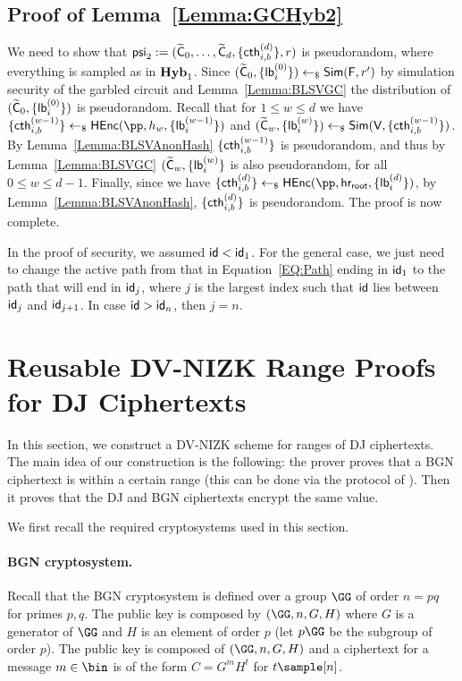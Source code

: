 \subsection{Proof of Lemma~\ref{Lemma:GCHyb2}}\label{SubSec:Lemma1proof2}
We need to show that $\mathsf{psi}_2 := (\widetilde{\mathsf{C}}_0, \dots , \widetilde{\mathsf{C}}_{d} , \{\mathsf{cth}^{(d)}_{i,b} \} , r)$ is pseudorandom, where everything is sampled as in $\mathsf{\mathbf{Hyb}}_1$.   Since $(\widetilde{\mathsf{C}}_0 , \{\mathsf{lb}_i^{(0)} \}) \leftarrow_\$ \mathsf{Sim}(\mathsf{F} , r')$ by simulation security of the garbled circuit and Lemma~\ref{Lemma:BLSVGC} the distribution of $(\widetilde{\mathsf{C}}_0 , \{\mathsf{lb}_i^{(0)} \})$ is pseudorandom. Recall that  for $1 \leq w \leq d$ we have $\{\cth^{(w-1)}_{i,b}\} \pick \HEnc(\pp , h_w , \{\lb_i^{(w-1)} \}  )$ and $(\widetilde{\mathsf{C}}_w , \{\mathsf{lb}_{i}^{(w)} \}) \leftarrow_\$ \mathsf{Sim}(\mathsf{V} , \{\mathsf{cth}_{i,b}^{(w-1)}\})$. By Lemma~\ref{Lemma:BLSVAnonHash} $\{\mathsf{cth}^{(w-1)}_{i,b}\}$ is pseudorandom, and thus by Lemma~\ref{Lemma:BLSVGC} $(\widetilde{\mathsf{C}}_w , \{\mathsf{lb}_{i}^{(w)} \}$ is also pseudorandom, for all $0 \leq w \leq d-1$. Finally, since we have  $\{\cth^{(d)}_{i,b} \} \pick \HEnc(\pp, \hr, \{\lb_{i}^{(d)} \} )$, by Lemma~\ref{Lemma:BLSVAnonHash}, $\{\mathsf{cth}^{(d)}_{i,b} \}$ is pseudorandom. The proof is now complete. 


\begin{remark}\label{Remark:Security1}
   In the proof of security, we assumed $\mathsf{id} < \mathsf{id}_1$. For the general case, we just need to change the active path from that  in Equation~\ref{EQ:Path} ending in $\mathsf{id}_1$ to the path that will end in $\mathsf{id}_j$, where $j$ is the largest index such that $\mathsf{id}$ lies between $\mathsf{id}_j$ and $\mathsf{id}_{j+1}$. In case $\mathsf{id} > \mathsf{id}_n$, then $j = n$.
\end{remark}


\section{Reusable DV-NIZK Range Proofs for DJ Ciphertexts}
\label{sec:rangeproofs}

In this section, we construct a DV-NIZK scheme for ranges of DJ ciphertexts. The main idea of our construction is the following: the prover proves that a BGN ciphertext \cite{TCC:BonGohNis05} is within a certain range (this can be done via the protocol of \cite{EC:GroOstSah06}). Then it proves that the DJ and BGN ciphertexts encrypt the same value.

We first recall the required cryptosystems used in this section.

\paragraph{BGN cryptosystem.} Recall that the BGN cryptosystem \cite{TCC:BonGohNis05} is defined over a group $\GG$ of order $n=pq$ for primes $p,q$. The public key is composed by $(\GG,n,G,H)$ where $G$ is a generator of $\GG$ and  $H$ is an element of order $p$ (let $p\GG$ be the subgroup of order $p$). The public key is composed of $(\GG,n,G,H)$ and a ciphertext for a message $m\in\bin$ is of the form $C=G^mH^t$ for  $t\sample [n]$.


